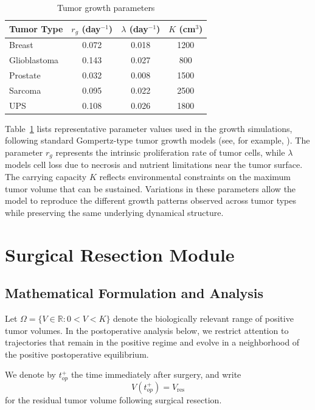 \documentclass[11pt, reqno]{amsart}
\numberwithin{equation}{section}
\theoremstyle{definition}
\begin{document}
\begin{table}[H]
\centering
\caption{Tumor growth parameters}\label{tab:params}
\begin{tabular}{lccc}
\toprule
Tumor Type & $r_g$ (day$^{-1}$) & $\lambda$ (day$^{-1}$) & $K$ (cm$^3$) \\
\midrule
Breast & 0.072 & 0.018 & 1200 \\
Glioblastoma & 0.143 & 0.027 & 800 \\
Prostate & 0.032 & 0.008 & 1500 \\
Sarcoma & 0.095 & 0.022 & 2500 \\
UPS & 0.108 & 0.026 & 1800 \\
\hline
\end{tabular}
\end{table}

Table~\ref{tab:params} lists representative parameter values used in the growth simulations, following standard Gompertz-type tumor growth models (see, for example, \cite{Benzekry2014, Laird1964,Norton1988}). The parameter $r_g$ represents the intrinsic proliferation rate of tumor cells, while $\lambda$ models cell loss due to necrosis and nutrient limitations near the tumor surface. The carrying capacity $K$ reflects environmental constraints on the maximum tumor volume that can be sustained. Variations in these parameters allow the model to reproduce the different growth patterns observed across tumor
types while preserving the same underlying dynamical structure.




\section{Surgical Resection Module}

\subsection{Mathematical Formulation and Analysis}

Let $\Omega = \{V \in \mathbb{R} : 0 < V < K\}$ denote the biologically relevant range of positive tumor volumes. In the postoperative analysis below, we restrict attention to trajectories that remain in the positive regime and evolve in a neighborhood of the positive postoperative equilibrium.

We denote by $t_{op}^+$ the time immediately after surgery, and write
\[
V(t_{op}^+)=V_{\mathrm{res}}
\]
for the residual tumor volume following surgical resection.
\end{document}
